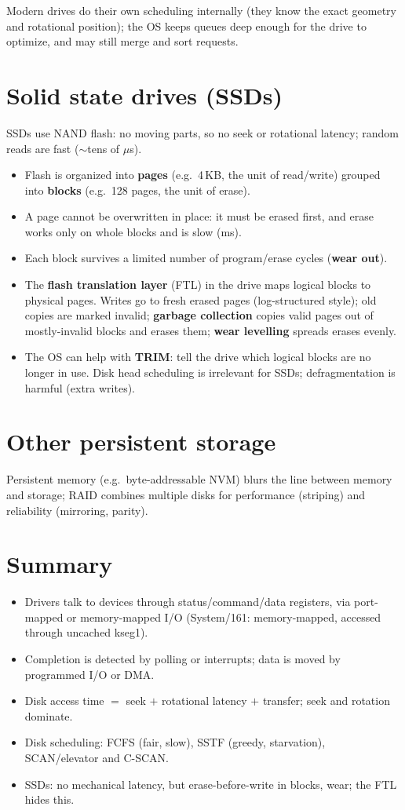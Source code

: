 Modern drives do their own scheduling internally (they know the exact geometry and rotational
position); the OS keeps queues deep enough for the drive to optimize, and may still merge and
sort requests.

\section{Solid state drives (SSDs)}

SSDs use NAND flash: no moving parts, so no seek or rotational latency; random reads are fast
($\sim$tens of $\mu$s).

\begin{itemize}
  \item Flash is organized into \textbf{pages} (e.g.\ 4\,KB, the unit of read/write) grouped into
    \textbf{blocks} (e.g.\ 128 pages, the unit of erase).
  \item A page cannot be overwritten in place: it must be erased first, and erase works only on
    whole blocks and is slow (ms).
  \item Each block survives a limited number of program/erase cycles (\textbf{wear out}).
  \item The \textbf{flash translation layer} (FTL) in the drive maps logical blocks to physical
    pages. Writes go to fresh erased pages (log-structured style); old copies are marked
    invalid; \textbf{garbage collection} copies valid pages out of mostly-invalid blocks and
    erases them; \textbf{wear levelling} spreads erases evenly.
  \item The OS can help with \textbf{TRIM}: tell the drive which logical blocks are no longer in
    use. Disk head scheduling is irrelevant for SSDs; defragmentation is harmful (extra writes).
\end{itemize}

\section{Other persistent storage}
Persistent memory (e.g.\ byte-addressable NVM) blurs the line between memory and storage; RAID
combines multiple disks for performance (striping) and reliability (mirroring, parity).

\section*{Summary}
\begin{itemize}
  \item Drivers talk to devices through status/command/data registers, via port-mapped or
    memory-mapped I/O (System/161: memory-mapped, accessed through uncached kseg1).
  \item Completion is detected by polling or interrupts; data is moved by programmed I/O or DMA.
  \item Disk access time $=$ seek $+$ rotational latency $+$ transfer; seek and rotation dominate.
  \item Disk scheduling: FCFS (fair, slow), SSTF (greedy, starvation), SCAN/elevator and C-SCAN.
  \item SSDs: no mechanical latency, but erase-before-write in blocks, wear; the FTL hides this.
\end{itemize}
